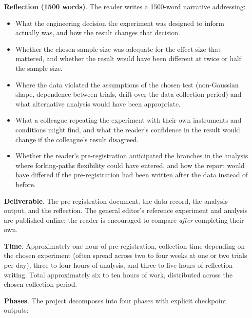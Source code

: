 \begin{project}
\textbf{Reflection (1500 words)}. The reader writes a 1500-word
narrative addressing:

\begin{itemize}[leftmargin=*]
  \item What the engineering decision the experiment was designed
    to inform actually was, and how the result changes that
    decision.
  \item Whether the chosen sample size was adequate for the effect
    size that mattered, and whether the result would have been
    different at twice or half the sample size.
  \item Where the data violated the assumptions of the chosen test
    (non-Gaussian shape, dependence between trials, drift over
    the data-collection period) and what alternative analysis
    would have been appropriate.
  \item What a colleague repeating the experiment with their own
    instruments and conditions might find, and what the reader's
    confidence in the result would change if the colleague's
    result disagreed.
  \item Whether the reader's pre-registration anticipated the
    branches in the analysis where forking-paths flexibility could
    have entered, and how the report would have differed if the
    pre-registration had been written after the data instead of
    before.
\end{itemize}

\textbf{Deliverable}. The pre-registration document, the data
record, the analysis output, and the reflection. The general
editor's reference experiment and analysis are published online; the
reader is encouraged to compare \emph{after} completing their own.

\textbf{Time}. Approximately one hour of pre-registration,
collection time depending on the chosen experiment (often spread
across two to four weeks at one or two trials per day), three to
four hours of analysis, and three to five hours of reflection
writing. Total approximately six to ten hours of work, distributed
across the chosen collection period.

\textbf{Phases}. The project decomposes into four phases with
explicit checkpoint outputs:


\end{project}
